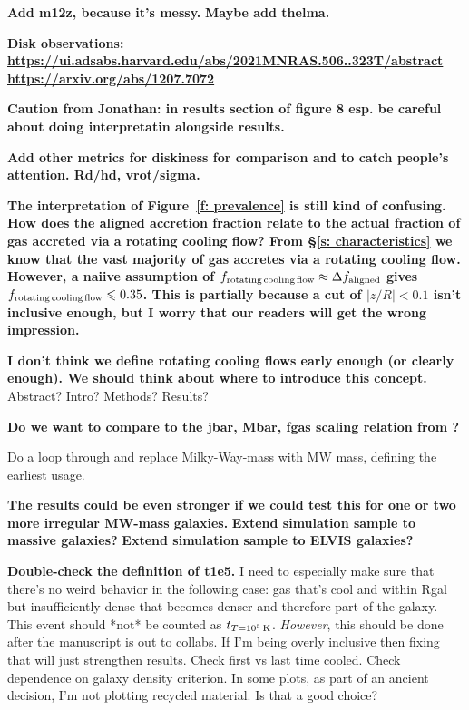 \documentclass[fleqn,usenatbib]{mnras}
\newcommand{\tcon}{t_{T=10^5\,{\rm K}}}
\begin{document}
\textbf{Add m12z, because it's messy.}
\textbf{Maybe add thelma.}

\textbf{Disk observations:
\url{https://ui.adsabs.harvard.edu/abs/2021MNRAS.506..323T/abstract}
\url{https://arxiv.org/abs/1207.7072}
}

\textbf{
Caution from Jonathan: in results section of figure 8 esp. be careful about doing interpretatin alongside results.
}

\textbf{Add other metrics for diskiness for comparison and to catch people's attention.
Rd/hd, vrot/sigma.
}

\textbf{
The interpretation of Figure~\ref{f: prevalence} is still kind of confusing.
How does the aligned accretion fraction relate to the actual fraction of gas accreted via a rotating cooling flow?
From \S\ref{s: characteristics} we know that the vast majority of gas accretes via a rotating cooling flow.
However, a naiive assumption of $f_{\rm rotating\,cooling\,flow} \approx \Delta f_{\rm aligned}$ gives $f_{\rm rotating\,cooling\,flow} \le 0.35$.
This is partially because a cut of $\vert z/R\vert < 0.1$ isn't inclusive enough, but I worry that our readers will get the wrong impression.
}

\textbf{
I don't think we define rotating cooling flows early enough (or clearly enough).
We should think about where to introduce this concept.
}
Abstract?
Intro?
Methods?
Results?

\textbf{Do we want to compare to the jbar, Mbar, fgas scaling relation from \cite{Pina2021}?}

Do a loop through and replace Milky-Way-mass with MW mass, defining the earliest usage.

\textbf{The results could be even stronger if we could test this for one or two more irregular MW-mass galaxies.}
\textbf{Extend simulation sample to massive galaxies?}
\textbf{Extend simulation sample to ELVIS galaxies?}

\textbf{Double-check the definition of t1e5.}
I need to especially make sure that there's no weird behavior in the following case:
gas that's cool and within Rgal but insufficiently dense that becomes denser and therefore part of the galaxy.
This event should *not* be counted as $\tcon$.
\textit{However}, this should be done after the manuscript is out to collabs.
If I'm being overly inclusive then fixing that will just strengthen results.
Check first vs last time cooled.
Check dependence on galaxy density criterion.
In some plots, as part of an ancient decision, I'm not plotting recycled material.
Is that a good choice?
\end{document}
